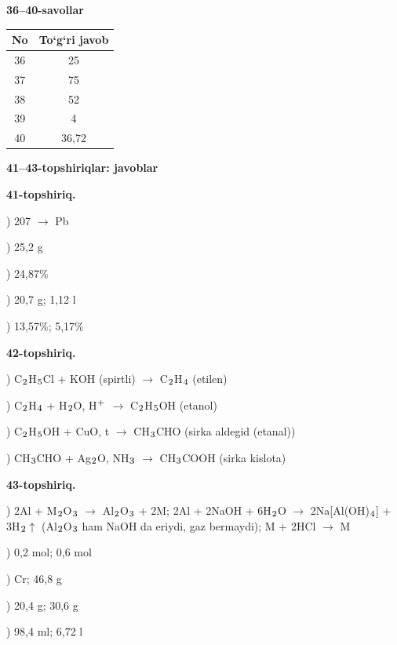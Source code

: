 \documentclass[11pt,a4paper]{article}
\renewcommand{\textsubscript}[1]{\ensuremath{_{\text{\fontsize{8}{8}\selectfont #1}}}}
\renewcommand{\textsuperscript}[1]{\ensuremath{^{\text{\fontsize{8}{8}\selectfont #1}}}}
\begin{document}
\noindent\textbf{36--40-savollar}\par\smallskip
\noindent\begin{tabular}{|c|c|}\hline \textbf{No} & \textbf{To`g`ri javob}\\\hline
36 & 25\\\hline
37 & 75\\\hline
38 & 52\\\hline
39 & 4\\\hline
40 & 36,72\\\hline
\end{tabular}\par\medskip
\noindent\textbf{41--43-topshiriqlar: javoblar}\par\smallskip
\noindent\textbf{41-topshiriq.}\par
{}) 207 $\to$ Pb\par
{}) 25,2 g\par
{}) 24,87\%\par
{}) 20,7 g; 1,12 l\par
{}) 13,57\%; 5,17\%\par
\noindent\textbf{42-topshiriq.}\par
{}) C\textsubscript{2}H\textsubscript{5}Cl + KOH (spirtli) $\to$ C\textsubscript{2}H\textsubscript{4} (etilen)\par
{}) C\textsubscript{2}H\textsubscript{4} + H\textsubscript{2}O, H\textsuperscript{+} $\to$ C\textsubscript{2}H\textsubscript{5}OH (etanol)\par
{}) C\textsubscript{2}H\textsubscript{5}OH + CuO, t\textdegree{} $\to$ CH\textsubscript{3}CHO (sirka aldegid (etanal))\par
{}) CH\textsubscript{3}CHO + Ag\textsubscript{2}O, NH\textsubscript{3} $\to$ CH\textsubscript{3}COOH (sirka kislota)\par
\noindent\textbf{43-topshiriq.}\par
{}) 2Al + M\textsubscript{2}O\textsubscript{3} $\to$ Al\textsubscript{2}O\textsubscript{3} + 2M; 2Al + 2NaOH + 6H\textsubscript{2}O $\to$ 2Na[Al(OH)\textsubscript{4}] + 3H\textsubscript{2}$\uparrow$ (Al\textsubscript{2}O\textsubscript{3} ham NaOH da eriydi, gaz bermaydi); M + 2HCl $\to$ M\par
{}) 0,2 mol; 0,6 mol\par
{}) Cr; 46,8 g\par
{}) 20,4 g; 30,6 g\par
{}) 98,4 ml; 6,72 l\par
\end{document}
